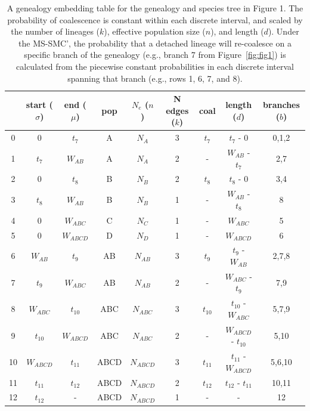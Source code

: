 \documentclass[11pt]{article}
\begin{document}
\begin{table}[t]
\centering
\caption{
	A genealogy embedding table for the genealogy and species tree in Figure 1. 
	The probability of coalescence is constant within each discrete interval, 
	and scaled by the number of lineages ($k$), effective population size ($n$), 
	and length ($d$).
	Under the MS-SMC', the probability that a detached lineage will re-coalesce
	on a specific branch of the genealogy (e.g., branch 7 from Figure~\ref{fig:fig1})
	is calculated from the piecewise constant probabilities in each 
	discrete interval spanning that branch (e.g., rows 1, 6, 7, and 8).
}
\begin{tabular}[t]{ |c|c|c|c|c|c|c|c|c| }
	\toprule
	 & start ($\sigma$)  & end ($\mu$)  & pop & $N_e$ ($n$)  & N edges ($k$) & coal  & length ($d$) & branches ($b$) \\
	\midrule
	0 & 0          & $t_7$      & A   & $N_A$     & 3 & $t_7$    & $t_7$ - 0            & 0,1,2 \\
	1 & $t_7$      & $W_{AB}$   & A   & $N_A$     & 2 & -        & $W_{AB}$ - $t_7$     & 2,7   \\	
	2 & 0          & $t_8$      & B   & $N_B$     & 2 & $t_8$    & $t_8$ - 0            & 3,4   \\ 
	3 & $t_8$      & $W_{AB}$   & B   & $N_B$     & 1 & -        & $W_{AB}$ - $t_8$     & 8     \\
	4 & 0          & $W_{ABC}$  & C   & $N_C$     & 1 & -        & $W_{ABC}$            & 5     \\
	5 & 0          & $W_{ABCD}$ & D   & $N_D$     & 1 & -        & $W_{ABCD}$           & 6     \\
	6 & $W_{AB}$   & $t_9$      & AB  & $N_{AB}$  & 3 & $t_9$    & $t_9$ - $W_{AB}$     & 2,7,8 \\
	7 & $t_9$      & $W_{ABC}$  & AB  & $N_{AB}$  & 2 & -        & $W_{ABC}$ - $t_9$    & 7,9   \\
	8 & $W_{ABC}$  & $t_{10}$   & ABC & $N_{ABC}$ & 3 & $t_{10}$ & $t_{10}$ - $W_{ABC}$ & 5,7,9  \\
	9 & $t_{10}$   & $W_{ABCD}$ & ABC & $N_{ABC}$ & 2 & -        & $W_{ABCD}$ - $t_{10}$ & 5,10 \\
	10 & $W_{ABCD}$ & $t_{11}$  & ABCD & $N_{ABCD}$ & 3 & $t_{11}$ & $t_{11}$ - $W_{ABCD}$ & 5,6,10 \\
	11 & $t_{11}$  & $t_{12}$   & ABCD & $N_{ABCD}$ & 2 & $t_{12}$ & $t_{12}$ - $t_{11}$ & 10,11 \\
	12 & $t_{12}$  & -          & ABCD & $N_{ABCD}$ & 1 & -        & -                   & 12    \\	
	\bottomrule
\end{tabular}
\label{tab:table-1} 
\end{table}
\end{document}
